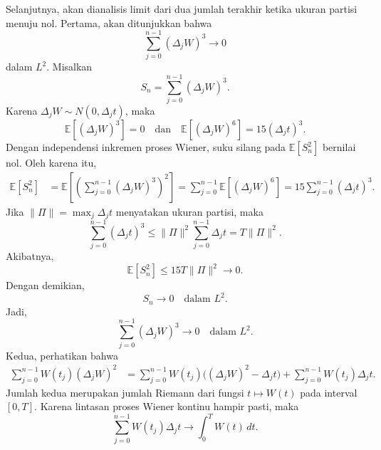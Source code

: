 \documentclass[aspectratio=169,11pt]{beamer}
\theoremstyle{definition}
\begin{document}
\begin{frame}[allowframebreaks]{\insertsection}{\insertsubsection}
  Selanjutnya, akan dianalisis limit dari dua jumlah terakhir ketika ukuran
  partisi menuju nol. Pertama, akan ditunjukkan bahwa
  \[
    \sum_{j=0}^{n-1}(\Delta_j W)^3 \longrightarrow 0
  \]
  dalam $L^2$. Misalkan
  \[
    S_n=\sum_{j=0}^{n-1}(\Delta_j W)^3.
  \]
  Karena $\Delta_j W\sim N(0,\Delta_j t)$, maka
  \[
    \mathbb{E}[(\Delta_j W)^3]=0
    \quad \text{dan} \quad
    \mathbb{E}[(\Delta_j W)^6]=15(\Delta_j t)^3.
  \]
  Dengan independensi inkremen proses Wiener, suku silang pada
  $\mathbb{E}[S_n^2]$ bernilai nol. Oleh karena itu,
  \[
    \begin{aligned}
      \mathbb{E}[S_n^2]
       & =
      \mathbb{E}\left[
                  \left(\sum_{j=0}^{n-1}(\Delta_j W)^3\right)^2
                  \right] =
      \sum_{j=0}^{n-1}\mathbb{E}[(\Delta_j W)^6]   =
      15\sum_{j=0}^{n-1}(\Delta_j t)^3.
    \end{aligned}
  \]
  Jika $\|\Pi\|=\max_j\Delta_j t$ menyatakan ukuran partisi, maka
  \[
    \sum_{j=0}^{n-1}(\Delta_j t)^3
    \leq
    \|\Pi\|^2\sum_{j=0}^{n-1}\Delta_j t
    =
    T\|\Pi\|^2.
  \]
  Akibatnya,
  \[
    \mathbb{E}[S_n^2]
    \leq
    15T\|\Pi\|^2
    \longrightarrow 0.
  \]
  Dengan demikian,
  \[
    S_n \longrightarrow 0
    \quad \text{dalam } L^2.
  \]
  Jadi,
  \[
    \sum_{j=0}^{n-1}(\Delta_j W)^3 \longrightarrow 0
    \quad \text{dalam } L^2.
  \]
  Kedua, perhatikan bahwa
  \[
    \begin{aligned}
      \sum_{j=0}^{n-1} W(t_j)(\Delta_j W)^2
       & =
      \sum_{j=0}^{n-1} W(t_j)\bigl((\Delta_j W)^2-\Delta_j t\bigr)
      +
      \sum_{j=0}^{n-1} W(t_j)\Delta_j t.
    \end{aligned}
  \]
  Jumlah kedua merupakan jumlah Riemann dari fungsi $t\mapsto W(t)$ pada
  interval $[0,T]$. Karena lintasan proses Wiener kontinu hampir pasti, maka
  \[
    \sum_{j=0}^{n-1} W(t_j)\Delta_j t
    \longrightarrow
    \int_0^T W(t)\,dt.
  \]


\end{frame}
\end{document}
